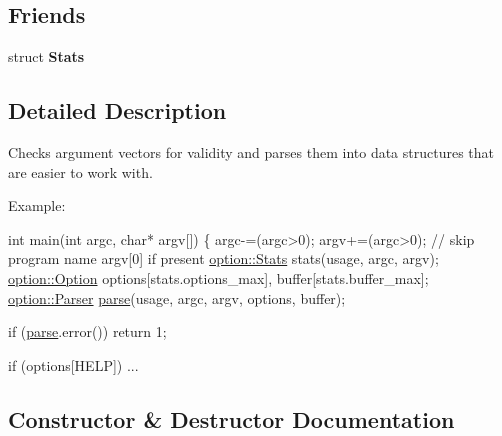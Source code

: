 \subsection*{Friends}
\begin{DoxyCompactItemize}
\item 
struct {\bfseries Stats}\hypertarget{classoption_1_1Parser_a7183dc3501d1c87153f9c0d41f869460}{}\label{classoption_1_1Parser_a7183dc3501d1c87153f9c0d41f869460}

\end{DoxyCompactItemize}


\subsection{Detailed Description}
Checks argument vectors for validity and parses them into data structures that are easier to work with. 

\begin{DoxyParagraph}{Example\+:}

\begin{DoxyCode}
\textcolor{keywordtype}{int} main(\textcolor{keywordtype}{int} argc, \textcolor{keywordtype}{char}* argv[])
\{
  argc-=(argc>0); argv+=(argc>0); \textcolor{comment}{// skip program name argv[0] if present}
  \hyperlink{structoption_1_1Stats}{option::Stats}  stats(usage, argc, argv);
  \hyperlink{classoption_1_1Option}{option::Option} options[stats.options\_max], buffer[stats.buffer\_max];
  \hyperlink{classoption_1_1Parser}{option::Parser} \hyperlink{classoption_1_1Parser_a6e0b5778d1cfbd6cd51240e74d01e138}{parse}(usage, argc, argv, options, buffer);

  \textcolor{keywordflow}{if} (\hyperlink{classoption_1_1Parser_a6e0b5778d1cfbd6cd51240e74d01e138}{parse}.error())
    \textcolor{keywordflow}{return} 1;

  \textcolor{keywordflow}{if} (options[HELP])
  ...
\end{DoxyCode}
 
\end{DoxyParagraph}


\subsection{Constructor \& Destructor Documentation}
